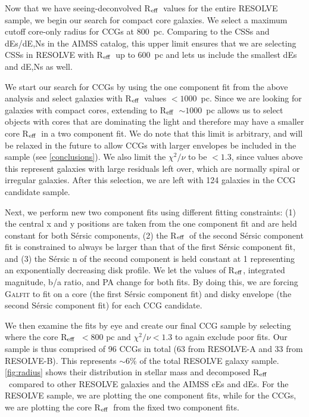 \documentclass[iop,apj]{emulateapj}
\newcommand{\Reff}{R$_{\rm eff}$}
\begin{document}
Now that we have seeing-deconvolved \Reff\ values for the entire RESOLVE sample, we begin our search for compact core galaxies. We select a maximum cutoff core-only radius for CCGs at 800~pc. Comparing to the CSSs and dEs/dE,Ns in the AIMSS catalog, this upper limit ensures that we are selecting CSSs in RESOLVE with \Reff\ up to 600~pc and lets us include the smallest dEs and dE,Ns as well.

We start our search for CCGs by using the one component fit from the above analysis and select galaxies with \Reff\ values $<1000$~pc. Since we are looking for galaxies with compact cores, extending to \Reff\ $\sim 1000$~pc allows us to select objects with cores that are dominating the light and therefore may have a smaller core \Reff\ in a two component fit. We do note that this limit is arbitrary, and will be relaxed in the future to allow CCGs with larger envelopes be included in the sample (see \autoref{conclusions}). We also limit the  $\chi^2/\nu$ to be $<1.3$, since values above this represent galaxies with large residuals left over, which are normally spiral or irregular galaxies. After this selection, we are left with 124 galaxies in the CCG candidate sample.

Next, we perform new two component fits using different fitting constraints: (1) the central x and y positions are taken from the one component fit and are held constant for both S\'ersic components, (2) the \Reff\ of the second S\'ersic component fit is constrained to always be larger than that of the first S\'ersic component fit, and (3) the S\'ersic n of the second component is held constant at 1 representing an exponentially decreasing disk profile. We let the values of \Reff, integrated magnitude, b/a ratio, and PA change for both fits. By doing this, we are forcing \textsc{Galfit} to fit on a core (the first S\'ersic component fit) and disky envelope (the second S\'ersic component fit) for each CCG candidate.

We then examine the fits by eye and create our final CCG sample by selecting where the core \Reff\ $< 800$ pc and $\chi^2/\nu < 1.3$ to again exclude poor fits. Our sample is thus comprised of 96 CCGs in total (63 from RESOLVE-A and 33 from RESOLVE-B). This represents $\sim6$\% of the total RESOLVE galaxy sample. \autoref{fig:radius} shows their distribution in stellar mass and decomposed \Reff\ compared to other RESOLVE galaxies and the AIMSS cEs and dEs. For the RESOLVE sample, we are plotting the one component fits, while for the CCGs, we are plotting the core \Reff\ from the fixed two component fits. 
\end{document}
